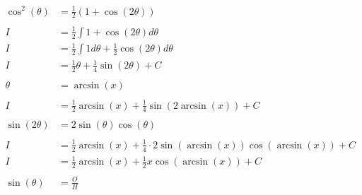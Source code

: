 \documentclass[12pt]{article}
\begin{document}
\begin{align}
    \cos^2(\theta)                  & = \frac{1}{2}(1+\cos(2\theta))                                                     \\
    \nonumber                                                                                                            \\
    I                               & = \frac{1}{2} \int 1+\cos(2\theta) d\theta                                         \\
    I                               & = \frac{1}{2} \int 1 d\theta + \frac{1}{2} \cos(2\theta) d\theta                   \\
    I                               & = \frac{1}{2} \theta + \frac{1}{4} \sin(2\theta) + C                               \\
    \nonumber                                                                                                            \\
    \theta                          & = \arcsin(x)                                                                       \\
    \nonumber                                                                                                            \\
    I                               & = \frac{1}{2} \arcsin(x) + \frac{1}{4} \sin(2\arcsin(x)) + C                       \\
    \nonumber                                                                                                            \\
    \sin(2\theta)                   & = 2\sin(\theta)\cos(\theta)                                                        \\
    \nonumber                                                                                                            \\
    I                               & = \frac{1}{2} \arcsin(x) + \frac{1}{4} \cdot 2\sin(\arcsin(x))\cos(\arcsin(x)) + C \\
    I                               & = \frac{1}{2} \arcsin(x) + \frac{1}{2} x\cos(\arcsin(x)) + C                       \\
    \nonumber                                                                                                            \\
    \sin(\theta)                    & = \frac{O}{H}                                                                      \\

\end{align}
\end{document}
